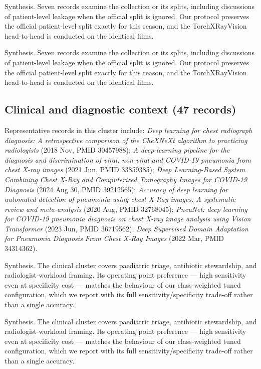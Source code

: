 Synthesis. Seven records examine the collection or its splits, including discussions of patient-level leakage when the official split is ignored. Our protocol preserves the official patient-level split exactly for this reason, and the TorchXRayVision head-to-head is conducted on the identical films.


Synthesis. Seven records examine the collection or its splits, including discussions of patient-level leakage when the official split is ignored. Our protocol preserves the official patient-level split exactly for this reason, and the TorchXRayVision head-to-head is conducted on the identical films.


\subsection*{Clinical and diagnostic context (47 records)}
Representative records in this cluster include: \emph{Deep learning for chest radiograph diagnosis: A retrospective comparison of the CheXNeXt algorithm to practicing radiologists} (2018 Nov, PMID 30457988); \emph{A deep-learning pipeline for the diagnosis and discrimination of viral, non-viral and COVID-19 pneumonia from chest X-ray images} (2021 Jun, PMID 33859385); \emph{Deep Learning-Based System Combining Chest X-Ray and Computerized Tomography Images for COVID-19 Diagnosis} (2024 Aug 30, PMID 39212565); \emph{Accuracy of deep learning for automated detection of pneumonia using chest X-Ray images: A systematic review and meta-analysis} (2020 Aug, PMID 32768045); \emph{PneuNet: deep learning for COVID-19 pneumonia diagnosis on chest X-ray image analysis using Vision Transformer} (2023 Jun, PMID 36719562); \emph{Deep Supervised Domain Adaptation for Pneumonia Diagnosis From Chest X-Ray Images} (2022 Mar, PMID 34314362).\par

Synthesis. The clinical cluster covers paediatric triage, antibiotic stewardship, and radiologist-workload framing. Its operating point preference --- high sensitivity even at specificity cost --- matches the behaviour of our class-weighted tuned configuration, which we report with its full sensitivity/specificity trade-off rather than a single accuracy.


Synthesis. The clinical cluster covers paediatric triage, antibiotic stewardship, and radiologist-workload framing. Its operating point preference --- high sensitivity even at specificity cost --- matches the behaviour of our class-weighted tuned configuration, which we report with its full sensitivity/specificity trade-off rather than a single accuracy.


